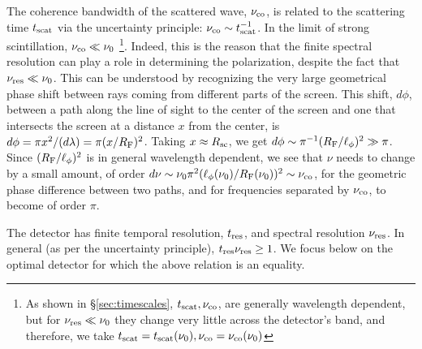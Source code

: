 \documentclass[fleqn,usenatbib]{mnras}
\begin{document}
	The coherence bandwidth of the scattered wave, $\nu_{\rm co}$, is related to the scattering time $t_{\rm scat}$ via the uncertainty principle: $\nu_{\rm co} \sim t_{\rm scat}^{-1}$. In the limit of strong scintillation, $\nu_{\rm co}\ll \nu_0$ \footnote{As shown in \S \ref{sec:timescales}, $t_{\rm scat},\nu_{\rm co}$, are generally wavelength dependent, but for $\nu_{\rm res}\ll \nu_0$ they change very little across the detector's band, and therefore, we take $t_{\rm scat}= t_{\rm scat}(\nu_0), \nu_{\rm co} = \nu_{\rm co}(\nu_0)$}. Indeed, this is the reason that the finite spectral resolution can play a role in determining the polarization, despite the fact that $\nu_{\rm res}\ll \nu_0$. This can be understood by recognizing the very large geometrical phase shift between rays coming from different parts of the screen. This shift, $d\phi$, between a path along the line of sight to the center of the screen and one that intersects the screen at a distance $x$ from the center, is $d\phi = \pi x^2/(d \lambda) = \pi (x/R_{\rm F})^2$.  Taking $x\approx R_{\rm sc}$, we get $d\phi \sim \pi^{-1} (R_{\rm F}/\ell_{\phi})^2 \gg \pi$. Since $(R_{\rm F}/\ell_{\phi})^2$ is in general wavelength dependent, we see that $\nu$ needs to change by a small amount, of order $d\nu\sim \nu_0 \pi^2 (\ell_{\phi}(\nu_0)/R_{\rm F}(\nu_0))^2 \sim \nu_{\rm co}$, for the geometric phase difference between two paths, and for frequencies separated by $\nu_{\rm co}$, to become of order $\pi$.
	
	The detector has finite temporal resolution, $t_{\rm res}$, and spectral resolution $\nu_{\rm res}$. In general (as per the uncertainty principle), $t_{\rm res} \nu_{\rm res}\geq 1$. We focus below on the optimal detector for which the above relation is an equality.
	
\end{document}
